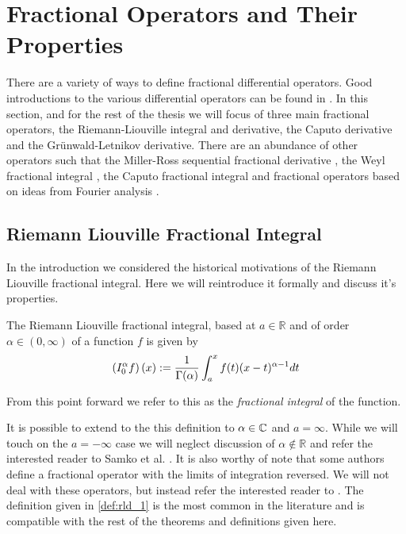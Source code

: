 \section{Fractional Operators and Their Properties}
\label{sec:operators}
There are a variety of ways to define fractional differential operators. Good introductions to the various differential operators can be found in \cite{Gorenflo1997, Podlubny1999, Diethelm2002, Samko1993}. In this section, and for the rest of the thesis we will focus of three main fractional operators, the Riemann-Liouville integral and derivative, the Caputo derivative and the Gr{\"u}nwald-Letnikov derivative. There are an abundance of other operators such that the Miller-Ross sequential fractional derivative \cite{Miller1993, Podlubny1999}, the Weyl fractional integral \cite{Gorenflo1997, Samko1993, Raina1979}, the Caputo fractional integral \cite{Gorenflo1997} and fractional operators based on ideas from Fourier analysis \cite{Narayanan2003, Samko1993}.


\subsection{Riemann Liouville Fractional Integral}
In the introduction we considered the historical motivations of the Riemann Liouville fractional integral. Here we will reintroduce it formally and discuss it's properties.
\begin{mdframed}[innertopmargin=10pt]
\begin{definition}
\label{def:rld_1}
The Riemann Liouville fractional integral, based at $ a \in \mathbb{R} $ and of order $ \alpha \in (0, \infty) $ of a function $ f $ is given by
\begin{align}
    \label{eq:rld_1}
    \left( I_{0}^{\alpha} f \right)(x) := \frac{1}{\Gamma(\alpha)} \int_a^x f(t)(x-t)^{\alpha - 1} dt
\end{align}
\end{definition}
\end{mdframed}
From this point forward we refer to this as the \emph{fractional integral} of the function.

It is possible to extend to the this definition to $ \alpha \in \mathbb{C} $ and $ a = \infty $. While we will touch on the $ a = -\infty $ case we will neglect discussion of $ \alpha \not\in \mathbb{R} $ and refer the interested reader to Samko et al. \cite{Samko1993}.  It is also worthy of note that some authors define a fractional operator with the limits of integration reversed. We will not deal with these operators, but instead refer the interested reader to \cite{Samko1993, Podlubny1999}. The definition given in \ref{def:rld_1} is the most common in the literature and is compatible with the rest of the theorems and definitions given here.

